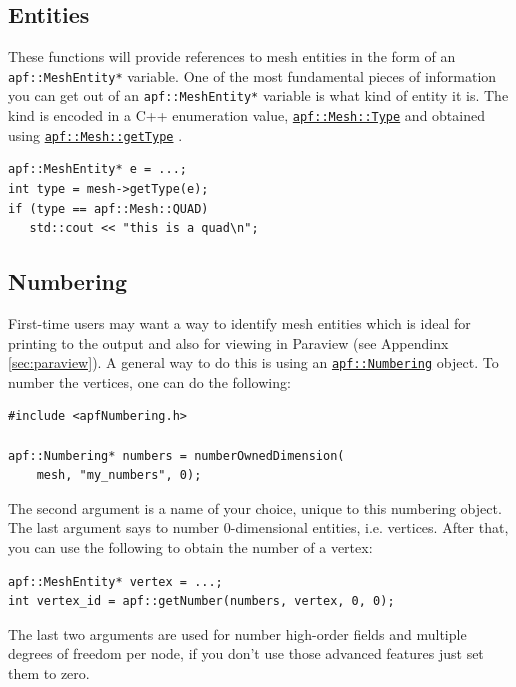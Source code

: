 \documentclass{article}
\begin{document}
\subsection{Entities}

These functions will provide references to mesh entities in the
form of an \texttt{apf::MeshEntity*} variable.
One of the most fundamental pieces of information you can get
out of an \texttt{apf::MeshEntity*} variable is what kind of
entity it is.
The kind is encoded in a C++ enumeration value,
\href{http://scorec.rpi.edu/~dibanez/core/classapf_1_1Mesh.html#a68729141a3c5781a24bb72ea6160b898}{\texttt{apf::Mesh::Type}}
and obtained using
\href{http://scorec.rpi.edu/~dibanez/core/classapf_1_1Mesh.html#a233fb2ada6d244ea1fffbbdd76e2f6b8}{\texttt{apf::Mesh::getType}}
.

\begin{lstlisting}
apf::MeshEntity* e = ...;
int type = mesh->getType(e);
if (type == apf::Mesh::QUAD)
   std::cout << "this is a quad\n";
\end{lstlisting}

\subsection{Numbering}
\label{sec:num}

First-time users may want a way to identify mesh entities which
is ideal for printing to the output and also for viewing in
Paraview (see Appendinx \ref{sec:paraview}).
A general way to do this is using an
\href{http://scorec.rpi.edu/~dibanez/core/apfNumbering_8h.html}{\texttt{apf::Numbering}}
object.
To number the vertices, one can do the following:

\begin{lstlisting}
#include <apfNumbering.h>

apf::Numbering* numbers = numberOwnedDimension(
    mesh, "my_numbers", 0);
\end{lstlisting}

The second argument is a name of your choice, unique to this numbering object.
The last argument says to number 0-dimensional entities, i.e. vertices.
After that, you can use the following to obtain the number of a
vertex:

\begin{lstlisting}
apf::MeshEntity* vertex = ...;
int vertex_id = apf::getNumber(numbers, vertex, 0, 0);
\end{lstlisting}

The last two arguments are used for number high-order fields and
multiple degrees of freedom per node, if you don't use those
advanced features just set them to zero.
\end{document}
